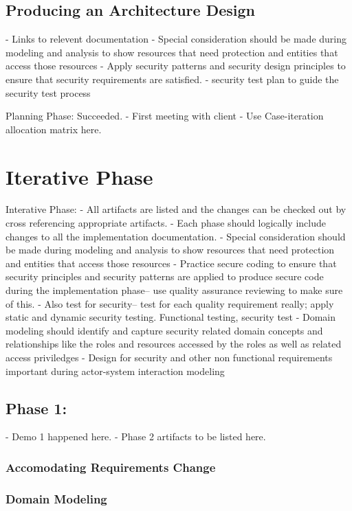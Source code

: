 \documentclass[11pt]{article}
\begin{document}
\subsection{Producing an Architecture Design}
 - Links to relevent documentation
- Special consideration should be made during modeling and analysis to show resources that need protection and entities that access those resources
- Apply security patterns and security design principles to ensure that security requirements are satisfied.
- security test plan to guide the security test process
 
Planning Phase: Succeeded.
 - First meeting with client
 - Use Case-iteration allocation matrix here.

\section{Iterative Phase}
 Interative Phase:
- All artifacts are listed and the changes can be checked out by cross referencing appropriate artifacts.
- Each phase should logically include changes to all the implementation documentation.
- Special consideration should be made during modeling and analysis to show resources that need protection and entities that access those resources
- Practice secure coding to ensure that security principles and security patterns are applied to produce secure code during the implementation phase-- use quality assurance reviewing to make sure of this.
- Also test for security-- test for each quality requirement really; apply static and dynamic security testing. Functional testing, security test
- Domain modeling should identify and capture security related domain concepts and relationships like the roles and resources accessed by the roles as well as related access priviledges
- Design for security and other non functional requirements important during actor-system interaction modeling

\subsection{Phase 1:}
 - Demo 1 happened here.
 - Phase 2 artifacts to be listed here.

\subsubsection{Accomodating Requirements Change}
 
\subsubsection{Domain Modeling}
 
\end{document}

